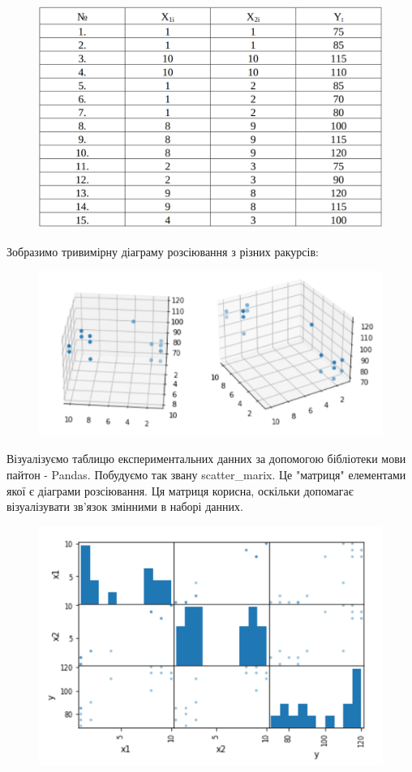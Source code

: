 \documentclass[a5paper, 20pt]{article}
\begin{document}
\begin{figure}[h]
\centering
\includegraphics[scale=0.54]{table}
\end{figure}


Зобразимо тривимірну діаграму розсіювання з різних ракурсів:


\begin{figure}[h]
\centering
\includegraphics[scale=0.54]{plot_for_second_task_3}
\end{figure}

\newpage{}

Візуалізуємо таблицю експериментальних данних за допомогою бібліотеки мови пайтон - Pandas. Побудуємо так звану scatter\_marix. Це "матриця" елементами якої є діаграми розсіювання.  Ця матриця корисна, оскільки допомагає візуалізувати зв'язок змінними в наборі данних. 

\begin{figure}[h]
\centering
\includegraphics[scale=1]{scatter_matrix}
\end{figure}
\end{document}
